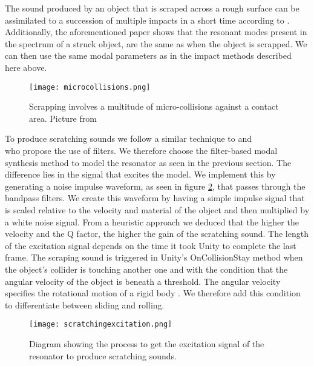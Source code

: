 The sound produced by an object that is scraped across a rough surface can be assimilated to a succession of multiple impacts in a short time according to \cite{gaver1993we}. Additionally, the aforementioned paper shows that the resonant modes present in the spectrum of a struck object, are the same as when the object is scrapped. We can then use the same modal parameters as in the impact methods described here above.

\begin{figure}[H]
  \centering
    \texttt{[image: microcollisions.png]}
      \caption{Scrapping involves a multitude of micro-collisions against a contact area. Picture from \cite{gaver1993we}}
      \label{fig:microcollisions}
\end{figure}

To produce scratching sounds we follow a similar technique to \cite{gaver1993we} and \\ \cite{van2001foleyautomatic} who propose the use of filters. We therefore choose the filter-based modal synthesis method to model the resonator as seen in the previous section. The difference lies in the signal that excites the model. We implement this by generating a noise impulse waveform, as seen in figure \ref{fig:scratchingimpulse}, that passes through the bandpass filters. We create this waveform by having a simple impulse signal that is scaled relative to the velocity and material of the object and then multiplied by a white noise signal. From a heuristic approach we deduced that the higher the velocity and the Q factor, the higher the gain of the scratching sound. The length of the excitation signal depends on the time it took Unity\textsuperscript{\textregistered} to complete the last frame. The scraping sound is triggered in Unity\textsuperscript{\textregistered}'s OnCollisionStay method when the object's collider is touching another one and with the condition that the angular velocity of the object is beneath a threshold. The angular velocity specifies the rotational motion of a rigid body \cite{sears1964university}. We therefore add this condition to differentiate between sliding and rolling.

\begin{figure}[H]
  \centering
    \texttt{[image: scratchingexcitation.png]}
      \caption{Diagram showing the process to get the excitation signal of the resonator to produce scratching sounds.}
      \label{fig:scratchingimpulse}
\end{figure} 

